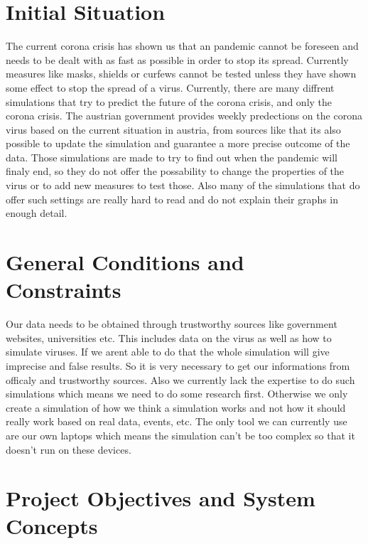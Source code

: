\documentclass[12pt]{article}
\theoremstyle{definition}
\begin{document}
\pagebreak

\section{Initial Situation}

The current corona crisis has shown us that an pandemic cannot be foreseen and needs to be dealt with as fast as possible in order to stop its spread.
Currently measures like masks, shields or curfews cannot be tested unless they have shown some effect to stop the spread of a virus.
Currently, there are many diffrent simulations that try to predict the future of the corona crisis,
and only the corona crisis. The austrian government provides weekly predections on the corona virus based on the current situation in austria, from sources like that its also possible to update the simulation and guarantee a more precise outcome of the data.
Those simulations are made to try to find out when the pandemic will finaly end,
so they do not offer the possability to change the properties of the virus or to add new measures to test those.
Also many of the simulations that do offer such settings are really hard to read and do not explain their graphs in enough detail.

\pagebreak

\section{General Conditions and Constraints}

Our data needs to be obtained through trustworthy sources like government websites, universities etc.
This includes data on the virus as well as how to simulate viruses.
If we arent able to do that the whole simulation will give imprecise and false results.
So it is very necessary to get our informations from officaly and trustworthy sources. 
Also we currently lack the expertise to do such simulations which means we need to do some research first.
Otherwise we only create a simulation of how we think a simulation works and not how it should really work based on real data, events, etc.
The only tool we can currently use are our own laptops which means the simulation can't be too complex so that it doesn't run on these devices.

\pagebreak

\section{Project Objectives and System Concepts}
\end{document}
